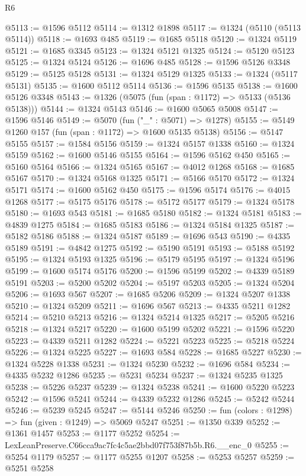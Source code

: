 \begin{lexlean}{R6}
\begin{coremodule}
@5113 := @1596 @5112
@5114 := @1312 @1898
@5117 := @1324 (@5110 (@5113 @5114))
@5118 := @1693 @485
@5119 := @1685 @5118
@5120 := @1324 @5119
@5121 := @1685 @3345
@5123 := @1324 @5121 @1325
@5124 := @5120 @5123
@5125 := @1324 @5124
@5126 := @1696 @485
@5128 := @1596 @5126 @3348
@5129 := @5125 @5128
@5131 := @1324 @5129 @1325
@5133 := @1324 (@5117 @5131)
@5135 := @1600 @5112 @5114
@5136 := @1596 @5135
@5138 := @1600 @5126 @3348
@5143 := @1326 (@5075 (fun (span : @1172) => @5133 (@5136 @5138)))
@5144 := @1324 @5143
@5146 := @1600 @5065 @5008
@5147 := @1596 @5146
@5149 := @5070 (fun ("_" : @5071) => @1278)
@5155 := @5149 @1260 @157 (fun (span : @1172) => @1600 @5135 @5138)
@5156 := @5147 @5155
@5157 := @1584 @5156
@5159 := @1324 @5157 @1338
@5160 := @1324 @5159
@5162 := @1600 @5146 @5155
@5164 := @1596 @5162 @450
@5165 := @5160 @5164
@5166 := @1324 @5165
@5167 := @4012 @1268
@5168 := @1685 @5167
@5170 := @1324 @5168 @1325
@5171 := @5166 @5170
@5172 := @1324 @5171
@5174 := @1600 @5162 @450
@5175 := @1596 @5174
@5176 := @4015 @1268
@5177 := @5175 @5176
@5178 := @5172 @5177
@5179 := @1324 @5178
@5180 := @1693 @543
@5181 := @1685 @5180
@5182 := @1324 @5181
@5183 := @4839 @1275
@5184 := @1685 @5183
@5186 := @1324 @5184 @1325
@5187 := @5182 @5186
@5188 := @1324 @5187
@5189 := @1696 @543
@5190 := @4335 @5189
@5191 := @4842 @1275
@5192 := @5190 @5191
@5193 := @5188 @5192
@5195 := @1324 @5193 @1325
@5196 := @5179 @5195
@5197 := @1324 @5196
@5199 := @1600 @5174 @5176
@5200 := @1596 @5199
@5202 := @4339 @5189 @5191
@5203 := @5200 @5202
@5204 := @5197 @5203
@5205 := @1324 @5204
@5206 := @1693 @567
@5207 := @1685 @5206
@5209 := @1324 @5207 @1338
@5210 := @1324 @5209
@5211 := @1696 @567
@5213 := @4335 @5211 @1282
@5214 := @5210 @5213
@5216 := @1324 @5214 @1325
@5217 := @5205 @5216
@5218 := @1324 @5217
@5220 := @1600 @5199 @5202
@5221 := @1596 @5220
@5223 := @4339 @5211 @1282
@5224 := @5221 @5223
@5225 := @5218 @5224
@5226 := @1324 @5225
@5227 := @1693 @584
@5228 := @1685 @5227
@5230 := @1324 @5228 @1338
@5231 := @1324 @5230
@5232 := @1696 @584
@5234 := @4335 @5232 @1286
@5235 := @5231 @5234
@5237 := @1324 @5235 @1325
@5238 := @5226 @5237
@5239 := @1324 @5238
@5241 := @1600 @5220 @5223
@5242 := @1596 @5241
@5244 := @4339 @5232 @1286
@5245 := @5242 @5244
@5246 := @5239 @5245
@5247 := @5144 @5246
@5250 := fun (colors : @1298) => fun (given : @1249) => @5069 @5247
@5251 := @1350 @339
@5252 := @1361 @1457
@5253 := @1177 @5252
@5254 := LexLeanPreserve.C66cca9ac7fc4c5ae2bbd07f753f87b5b.R6.__enc_0
@5255 := @5254 @1179
@5257 := @1177 @5255 @1207
@5258 := @5253 @5257
@5259 := @5251 @5258

\end{coremodule}
\end{lexlean}
